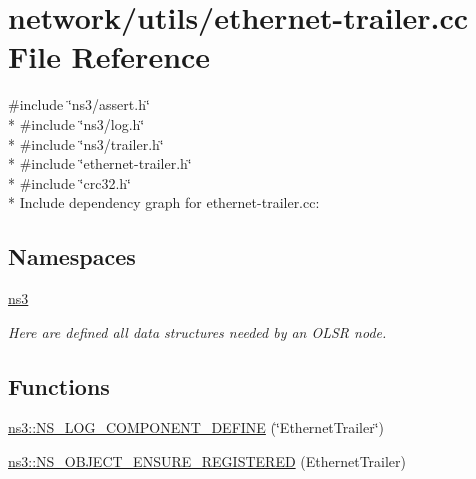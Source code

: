 \hypertarget{ethernet-trailer_8cc}{}\section{network/utils/ethernet-\/trailer.cc File Reference}
\label{ethernet-trailer_8cc}
{\ttfamily \#include \char`\"{}ns3/assert.\+h\char`\"{}}\\*
{\ttfamily \#include \char`\"{}ns3/log.\+h\char`\"{}}\\*
{\ttfamily \#include \char`\"{}ns3/trailer.\+h\char`\"{}}\\*
{\ttfamily \#include \char`\"{}ethernet-\/trailer.\+h\char`\"{}}\\*
{\ttfamily \#include \char`\"{}crc32.\+h\char`\"{}}\\*
Include dependency graph for ethernet-\/trailer.cc\+:
\subsection*{Namespaces}
\begin{DoxyCompactItemize}
\item 
 \hyperlink{namespacens3}{ns3}
\begin{DoxyCompactList}\small\item\em Here are defined all data structures needed by an O\+L\+SR node. \end{DoxyCompactList}\end{DoxyCompactItemize}
\subsection*{Functions}
\begin{DoxyCompactItemize}
\item 
\hyperlink{namespacens3_abae2e6a6c52dc33ea51d224f9c633180}{ns3\+::\+N\+S\+\_\+\+L\+O\+G\+\_\+\+C\+O\+M\+P\+O\+N\+E\+N\+T\+\_\+\+D\+E\+F\+I\+NE} (\char`\"{}Ethernet\+Trailer\char`\"{})
\item 
\hyperlink{namespacens3_a8f92656ee21316f70dee35c19e1d51ee}{ns3\+::\+N\+S\+\_\+\+O\+B\+J\+E\+C\+T\+\_\+\+E\+N\+S\+U\+R\+E\+\_\+\+R\+E\+G\+I\+S\+T\+E\+R\+ED} (Ethernet\+Trailer)
\end{DoxyCompactItemize}
